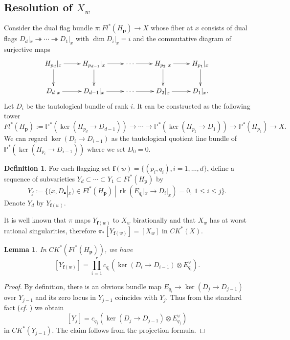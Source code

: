 \documentclass[12pt, reqno,sumlimits]{amsart}
\newtheorem{lem}[thm]{Lemma}
\theoremstyle{definition}
\newtheorem{defn}[thm]{Definition}
\numberwithin{equation}{section}
\newcommand{\PP}{{\mathbb P}}
\newcommand{\bff}{{\mathbf f }}
\newcommand{\bfp}{{\mathbf p}}
\newcommand{\CK}{{C\!K}}
\newcommand{\surj}{\twoheadrightarrow}
\newcommand{\Fl}{{Fl}}
\newcommand{\rk}{{\operatorname{rk}}}
\begin{document}
\subsection{Resolution of $X_w$}
Consider the dual flag bundle $\pi: \Fl^*(H_{\bfp}) \to X$ whose fiber at $x$ consists of dual flags $D_d|_x \surj \cdots \surj D_1|_x$ with $\dim D_i|_x=i$ and the commutative diagram of surjective maps
\[
\xymatrix{
H_{p_d}|_x \ar[r] \ar[d]& H_{p_{d-1}}|_x \ar[r]  \ar[d]&\cdots \ar[r] &  H_{p_2}|_x \ar[r] \ar[d]& H_{p_1}|_x \ar[d]\\ 
D_{d}|_x \ar[r] & D_{d-1}|_x \ar[r]  &\cdots \ar[r] &  D_2|_x \ar[r] & D_1|_x. 
}
\]
Let $D_i$ be the tautological bundle of rank $i$. It can be constructed as the following tower
\[
\Fl^*(H_{\bfp}):=\PP^*(\ker(H_{p_d} \to D_{d-1}))\to \cdots \to \PP^*(\ker(H_{p_2} \to D_1))\to \PP^*(H_{p_1}) \to X.
\]
We can regard $\ker(D_i \to D_{i-1})$ as the tautological quotient line bundle of $\PP^*(\ker(H_{p_i} \to D_{i-1}))$ where we set $D_0=0$. 
\begin{defn}\label{defnY}
For each flagging set $\bff(w)=\{(p_i,q_i), i=1,\dots,d\}$, define a sequence of subvarieties $Y_d \subset \cdots \subset Y_1 \subset \Fl^*(H_{\bfp})$ by
\[
Y_j:= \{ (x, D_{\bullet}|_x)  \in \Fl^*(H_{\bfp})\ |\ \rk(E_{q_i}|_x \to D_i|_x) = 0, \ 1 \leq i \leq j \}.
\]
Denote $Y_d$ by $Y_{\bff(w)}$.
\end{defn}
It is well known that $\pi$ maps $Y_{\bff(w)}$ to $X_w$ birationally and that $X_w$ has at worst rational singularities,  therefore $\pi_*[Y_{\bff(w)}]=[X_w]$ in $\CK^*(X)$.
\begin{lem}\label{lemYd}
In $\CK^*(\Fl^*(H_{\bfp}))$, we have
\[
[Y_{\bff(w)}] = \prod_{i=1}^r c_{q_i}(\ker(D_i \to D_{i-1}) \otimes E_{q_i}^{\vee}).
\]
\end{lem}
\begin{proof}
By definition, there is an obvious bundle map $E_{q_i} \to \ker(D_j\to D_{j-1})$ over $Y_{j-1}$ and its zero locus in $Y_{j-1}$ coincides with $Y_j$. Thus from the standard fact ({\it cf.} \cite[Lemma 2.2]{HIMN}) we obtain 
\[
[Y_j] = c_{q_j}(\ker(D_j\to D_{j-1})\otimes E_{q_j}^{\vee})
\]
in $\CK^*(Y_{j-1})$. The claim follows from the projection formula.
\end{proof}
\end{document}
